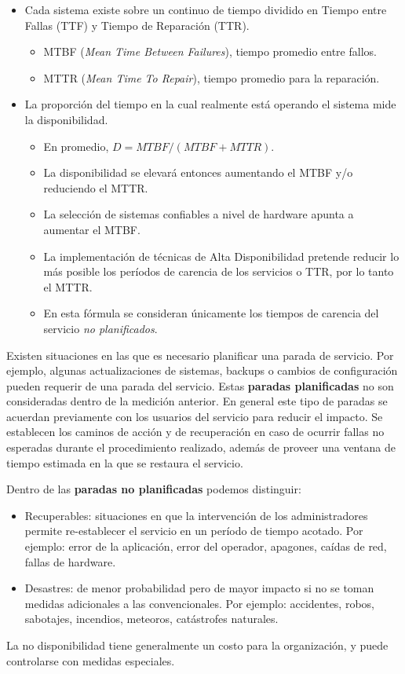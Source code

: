 \begin{itemize}	

	\item Cada sistema existe sobre un continuo de tiempo dividido en Tiempo entre Fallas (TTF) y Tiempo de Reparación (TTR). 
	\begin{itemize}
		\item MTBF (\textit{Mean Time Between Failures}), tiempo promedio entre fallos.
		\item MTTR (\textit{Mean Time To Repair}), tiempo promedio para la reparación.
	\end{itemize}
	\item La proporción del tiempo en la cual realmente está operando el sistema mide la disponibilidad. 
	\begin{itemize}
		\item En promedio, $D = MTBF / (MTBF + MTTR)$.
		\item La disponibilidad se elevará entonces aumentando el MTBF y/o reduciendo el MTTR. 
		\item La selección de sistemas confiables a nivel de hardware apunta a aumentar el MTBF. 
		\item La implementación de técnicas de Alta Disponibilidad pretende reducir lo más posible los períodos de carencia de los servicios o TTR, por lo tanto el MTTR. 
		\item En esta fórmula se consideran únicamente los tiempos de carencia del servicio \textit{no planificados}.

	\end{itemize}
	\end{itemize}

Existen situaciones en las que es necesario planificar una parada de servicio. Por ejemplo, algunas actualizaciones de sistemas, backups o cambios de configuración pueden requerir de una parada del servicio. Estas {\bf paradas planificadas} no son consideradas dentro de la medición anterior. En general este tipo de 
paradas se acuerdan previamente con los usuarios del servicio para reducir 
el impacto. Se establecen los caminos de acción y de recuperación en caso de
ocurrir fallas no esperadas durante el procedimiento realizado, además de 
proveer una ventana de tiempo estimada en la que se restaura el servicio. 

Dentro de las {\bf paradas no planificadas} podemos distinguir:
	\begin{itemize}		
		\item Recuperables: situaciones en que la intervención de los 
administradores permite re-establecer el servicio en un período de tiempo acotado. Por ejemplo: error de la aplicación, error del operador, apagones, caídas de red, fallas de hardware. 
		\item Desastres: de menor probabilidad pero de mayor impacto si 
no se toman medidas adicionales a las convencionales. Por ejemplo: accidentes, robos, sabotajes, incendios, meteoros, catástrofes naturales. 

	\end{itemize}
	La no disponibilidad tiene generalmente un costo para la organización, y puede controlarse con medidas especiales.

